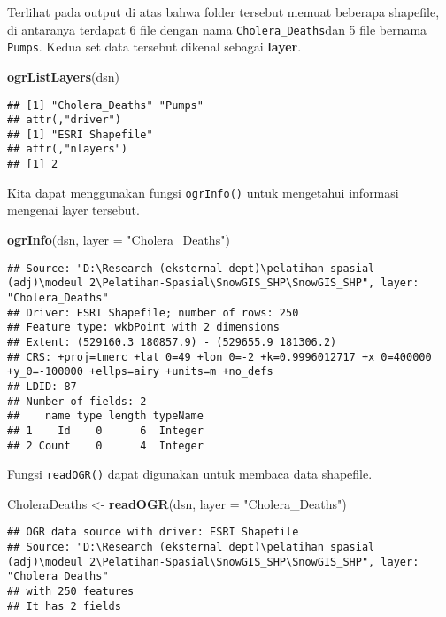\documentclass[
]{book}
\newenvironment{Shaded}{\begin{snugshade}}{\end{snugshade}}
\newcommand{\DataTypeTok}[1]{\textcolor[rgb]{0.13,0.29,0.53}{#1}}
\newcommand{\KeywordTok}[1]{\textcolor[rgb]{0.13,0.29,0.53}{\textbf{#1}}}
\newcommand{\NormalTok}[1]{#1}
\newcommand{\StringTok}[1]{\textcolor[rgb]{0.31,0.60,0.02}{#1}}
\begin{document}
Terlihat pada output di atas bahwa folder tersebut memuat beberapa shapefile, di antaranya terdapat 6 file dengan nama \texttt{Cholera\_Deaths}dan 5 file bernama \texttt{Pumps}. Kedua set data tersebut dikenal sebagai \textbf{layer}.

\begin{Shaded}
\begin{Highlighting}[]
\KeywordTok{ogrListLayers}\NormalTok{(dsn)}
\end{Highlighting}
\end{Shaded}

\begin{verbatim}
## [1] "Cholera_Deaths" "Pumps"         
## attr(,"driver")
## [1] "ESRI Shapefile"
## attr(,"nlayers")
## [1] 2
\end{verbatim}

Kita dapat menggunakan fungsi \texttt{ogrInfo()} untuk mengetahui informasi mengenai layer tersebut.

\begin{Shaded}
\begin{Highlighting}[]
\KeywordTok{ogrInfo}\NormalTok{(dsn, }\DataTypeTok{layer =} \StringTok{"Cholera\_Deaths"}\NormalTok{)}
\end{Highlighting}
\end{Shaded}

\begin{verbatim}
## Source: "D:\Research (eksternal dept)\pelatihan spasial (adj)\modeul 2\Pelatihan-Spasial\SnowGIS_SHP\SnowGIS_SHP", layer: "Cholera_Deaths"
## Driver: ESRI Shapefile; number of rows: 250 
## Feature type: wkbPoint with 2 dimensions
## Extent: (529160.3 180857.9) - (529655.9 181306.2)
## CRS: +proj=tmerc +lat_0=49 +lon_0=-2 +k=0.9996012717 +x_0=400000 +y_0=-100000 +ellps=airy +units=m +no_defs 
## LDID: 87 
## Number of fields: 2 
##    name type length typeName
## 1    Id    0      6  Integer
## 2 Count    0      4  Integer
\end{verbatim}

Fungsi \texttt{readOGR()} dapat digunakan untuk membaca data shapefile.

\begin{Shaded}
\begin{Highlighting}[]
\NormalTok{CholeraDeaths \textless{}{-}}\StringTok{ }\KeywordTok{readOGR}\NormalTok{(dsn, }\DataTypeTok{layer =} \StringTok{"Cholera\_Deaths"}\NormalTok{)}
\end{Highlighting}
\end{Shaded}

\begin{verbatim}
## OGR data source with driver: ESRI Shapefile 
## Source: "D:\Research (eksternal dept)\pelatihan spasial (adj)\modeul 2\Pelatihan-Spasial\SnowGIS_SHP\SnowGIS_SHP", layer: "Cholera_Deaths"
## with 250 features
## It has 2 fields
\end{verbatim}
\end{document}
